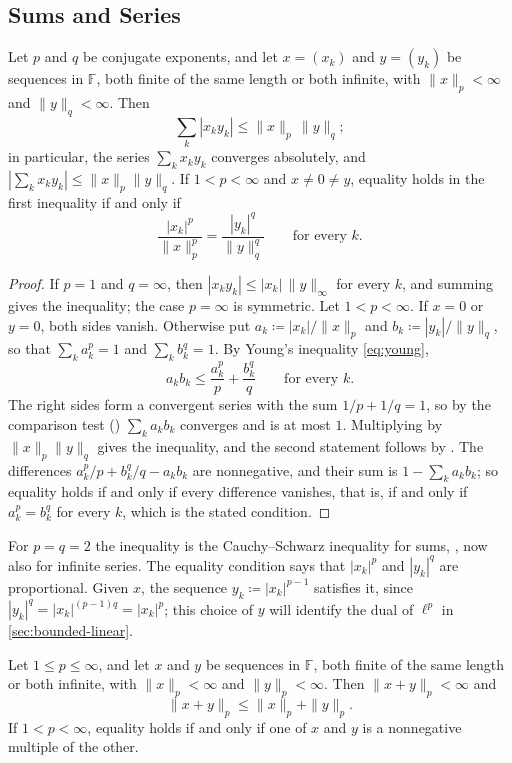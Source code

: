 \subsection{Sums and Series}

\begin{theorem}
\label{thm:holder}
Let $p$ and $q$ be conjugate exponents, and let $x=(x_k)$ and $y=(y_k)$ be sequences in $\mathbb F$, both finite of the same length or both infinite, with $\|x\|_p<\infty$ and $\|y\|_q<\infty$. Then
\[
\sum_k|x_ky_k|\le\|x\|_p\,\|y\|_q ;
\]
in particular, the series $\sum_kx_ky_k$ converges absolutely, and $|\sum_kx_ky_k|\le\|x\|_p\|y\|_q$. If $1<p<\infty$ and $x\ne0\ne y$, equality holds in the first inequality if and only if
\[
\frac{|x_k|^p}{\|x\|_p^p}=\frac{|y_k|^q}{\|y\|_q^q}\qquad\text{for every }k .
\]
\end{theorem}

\begin{proof}
If $p=1$ and $q=\infty$, then $|x_ky_k|\le|x_k|\,\|y\|_\infty$ for every $k$, and summing gives the inequality; the case $p=\infty$ is symmetric. Let $1<p<\infty$. If $x=0$ or $y=0$, both sides vanish. Otherwise put $a_k\coloneqq|x_k|/\|x\|_p$ and $b_k\coloneqq|y_k|/\|y\|_q$, so that $\sum_ka_k^p=1$ and $\sum_kb_k^q=1$. By Young's inequality \eqref{eq:young},
\[
a_kb_k\le\frac{a_k^p}p+\frac{b_k^q}q\qquad\text{for every }k .
\]
The right sides form a convergent series with the sum $1/p+1/q=1$, so by the comparison test () $\sum_ka_kb_k$ converges and is at most $1$. Multiplying by $\|x\|_p\|y\|_q$ gives the inequality, and the second statement follows by . The differences $a_k^p/p+b_k^q/q-a_kb_k$ are nonnegative, and their sum is $1-\sum_ka_kb_k$; so equality holds if and only if every difference vanishes, that is, if and only if $a_k^p=b_k^q$ for every $k$, which is the stated condition.
\end{proof}

For $p=q=2$ the inequality is the Cauchy--Schwarz inequality for sums, , now also for infinite series. The equality condition says that $|x_k|^p$ and $|y_k|^q$ are proportional. Given $x$, the sequence $y_k\coloneqq|x_k|^{p-1}$ satisfies it, since $|y_k|^q=|x_k|^{(p-1)q}=|x_k|^p$; this choice of $y$ will identify the dual of $\ell^p$ in \cref{sec:bounded-linear}.

\begin{theorem}
\label{thm:minkowski}
Let $1\le p\le\infty$, and let $x$ and $y$ be sequences in $\mathbb F$, both finite of the same length or both infinite, with $\|x\|_p<\infty$ and $\|y\|_p<\infty$. Then $\|x+y\|_p<\infty$ and
\[
\|x+y\|_p\le\|x\|_p+\|y\|_p .
\]
If $1<p<\infty$, equality holds if and only if one of $x$ and $y$ is a nonnegative multiple of the other.
\end{theorem}

